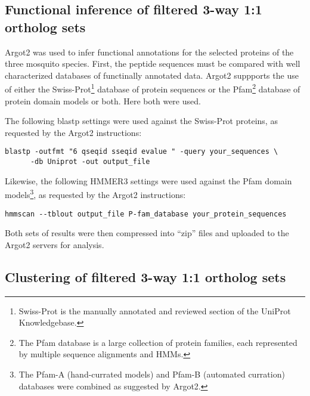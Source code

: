 \subsection{Functional inference of filtered 3-way 1:1 ortholog sets}

\gls{Argot2} was used to infer functional annotations for the selected proteins of the three mosquito species.
First, the peptide sequences must be compared with well characterized databases of functinally annotated data.
\gls{Argot2} suppports the use of either the Swiss-Prot\footnote{Swiss-Prot is the manually annotated and reviewed section of the UniProt Knowledgebase.} database of protein sequences or the \gls{Pfam}\footnote{The Pfam database is a large collection of protein families, each represented by multiple sequence alignments and \glspl{HMM}.} database of protein domain models or both.
Here both were used.

The following blastp settings were used against the \gls{Swiss-Prot} proteins, as requested by the \gls{Argot2} instructions:

\begin{Verbatim}
blastp -outfmt "6 qseqid sseqid evalue " -query your_sequences \
      -db Uniprot -out output_file
\end{Verbatim}

Likewise, the following HMMER3 settings were used against the \gls{Pfam} domain models\footnote{The Pfam-A (hand-currated models) and Pfam-B (automated curration) databases were combined as suggested by \gls{Argot2}.}, as requested by the \gls{Argot2} instructions:


\begin{Verbatim}
hmmscan --tblout output_file P-fam_database your_protein_sequences
\end{Verbatim}

Both sets of results were then compressed into ``zip'' files and uploaded to the \gls{Argot2} servers for analysis.

\subsection{Clustering of filtered 3-way 1:1 ortholog sets}

